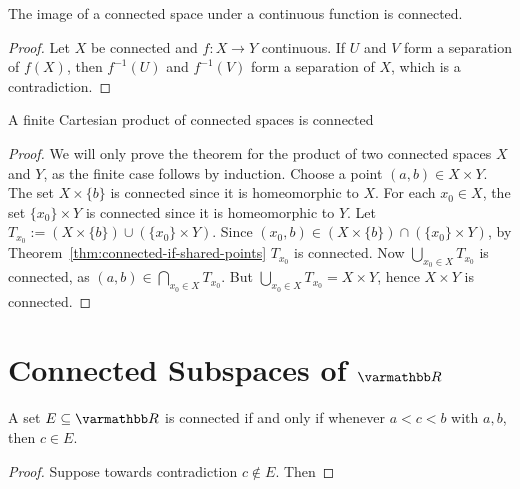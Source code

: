 \begin{theorem}
The image of a connected space under a continuous function is connected.
\end{theorem}
    \begin{proof}
        Let $X$ be connected and $f:X \rightarrow Y$ continuous. If $U$ and $V$ form a separation of $f(X)$, then $f^{-1}(U)$ and $f^{-1}(V)$ form a separation of $X$, which is a contradiction.
    \end{proof}

\begin{theorem}
    A finite Cartesian product of connected spaces is connected
\end{theorem}
    \begin{proof}
        We will only prove the theorem for the product of two connected spaces $X$ and $Y$, as the finite case follows by induction. Choose a point $(a,b) \in X \times Y$. The set $X \times \{b\}$ is connected since it is homeomorphic to $X$. For each $x_0 \in X$, the set $\{x_0\} \times Y$ is connected since it is homeomorphic to $Y$. Let $T_{x_0} := (X \times \{b\}) \cup (\{x_0\} \times Y)$. Since $(x_0,b) \in (X \times \{b\}) \cap (\{x_0\} \times Y)$, by Theorem~\ref{thm:connected-if-shared-points} $T_{x_0}$ is connected. Now $\bigcup_{x_0 \in X}T_{x_0}$ is connected, as $(a,b) \in \bigcap_{x_0 \in X}T_{x_0}$. But $\bigcup_{x_0 \in X}T_{x_0} = X \times Y$, hence $X \times Y$ is connected.
    \end{proof}

\section{Connected Subspaces of $\bfR$}

\begin{theorem}
    A set $E \subseteq \bfR$ is connected if and only if whenever $a < c < b$ with $a,b$, then $c \in E$.
\end{theorem}
    \begin{proof}
        Suppose towards contradiction $c \not\in E$. Then 
    \end{proof}


